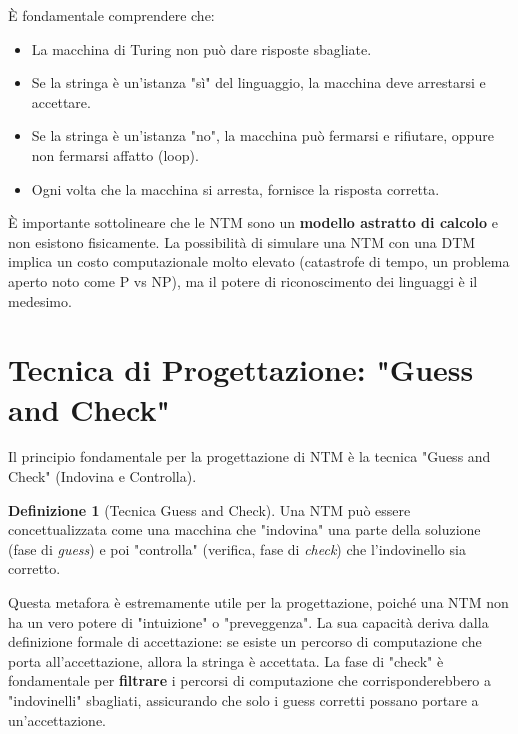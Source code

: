\documentclass[a4paper]{article}
\theoremstyle{definition} %
\newtheorem{definition}{Definizione}[section]
\begin{document}
È fondamentale comprendere che:
\begin{itemize}
    \item La macchina di Turing non può dare risposte sbagliate.
    \item Se la stringa è un'istanza "sì" del linguaggio, la macchina deve arrestarsi e accettare.
    \item Se la stringa è un'istanza "no", la macchina può fermarsi e rifiutare, oppure non fermarsi affatto (loop).
    \item Ogni volta che la macchina si arresta, fornisce la risposta corretta.
\end{itemize}

È importante sottolineare che le NTM sono un \textbf{modello astratto di calcolo} e non esistono fisicamente. La possibilità di simulare una NTM con una DTM implica un costo computazionale molto elevato (catastrofe di tempo, un problema aperto noto come P vs NP), ma il potere di riconoscimento dei linguaggi è il medesimo.

\section{Tecnica di Progettazione: "Guess and Check"}

Il principio fondamentale per la progettazione di NTM è la tecnica "Guess and Check" (Indovina e Controlla).

\begin{definition}[Tecnica Guess and Check]
Una NTM può essere concettualizzata come una macchina che "indovina" una parte della soluzione (fase di \emph{guess}) e poi "controlla" (verifica, fase di \emph{check}) che l'indovinello sia corretto.
\end{definition}

Questa metafora è estremamente utile per la progettazione, poiché una NTM non ha un vero potere di "intuizione" o "preveggenza". La sua capacità deriva dalla definizione formale di accettazione: se esiste un percorso di computazione che porta all'accettazione, allora la stringa è accettata. La fase di "check" è fondamentale per \textbf{filtrare} i percorsi di computazione che corrisponderebbero a "indovinelli" sbagliati, assicurando che solo i guess corretti possano portare a un'accettazione.
\end{document}
